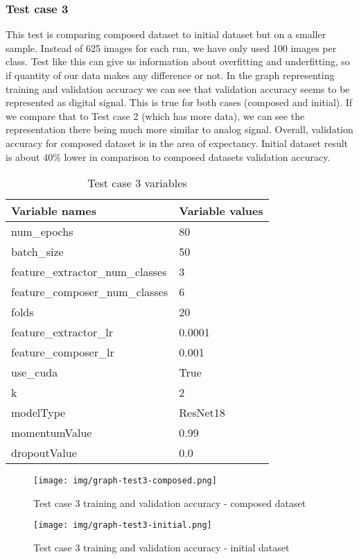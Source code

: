 \subsubsection{Test case 3}
This test is comparing composed dataset to initial dataset but on a smaller sample. Instead of 625 images for each run, we have only used 100 images per class. Test like this can give us information about overfitting and underfitting, so if quantity of our data makes any difference or not.
\newline
In the graph representing training and validation accuracy we can see that validation accuracy seems to be represented as digital signal. This is true for both cases (composed and initial). If we compare that to Test case 2 (which has more data), we can see the representation there being much more similar to analog signal.
Overall, validation accuracy for composed dataset is in the area of expectancy. Initial dataset result is about 40\% lower in comparison to composed datasets validation accuracy.
\begin{table}[!ht]
  \centering
    \begin{tabular}{ |m{15em}|m{17em}| } 
     \hline
        Variable names & Variable values \\ 
     \hline
        num{\_}epochs & 80 \\ 
     \hline
        batch{\_}size & 50 \\
     \hline
        feature{\_}extractor{\_}num{\_}classes & 3 \\
     \hline
        feature{\_}composer{\_}num{\_}classes & 6 \\
     \hline
        folds & 20 \\
     \hline
        feature{\_}extractor{\_}lr & 0.0001 \\
     \hline
        feature{\_}composer{\_}lr & 0.001 \\
     \hline
        use{\_}cuda & True \\
     \hline
        k & 2 \\
     \hline
        modelType & ResNet18 \\
     \hline
        momentumValue & 0.99 \\
     \hline
        dropoutValue & 0.0 \\
     \hline
    \end{tabular}
\caption{Test case 3 variables}
\end{table}

\begin{figure}[H]
    \centerline{\texttt{[image: img/graph-test3-composed.png]}}
    \caption{Test case 3 training and validation accuracy - composed dataset}
\end{figure}
\begin{figure}[H]
    \centerline{\texttt{[image: img/graph-test3-initial.png]}}
    \caption{Test case 3 training and validation accuracy - initial dataset}
\end{figure}


